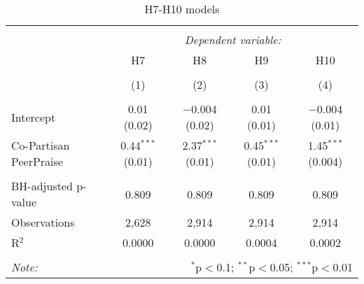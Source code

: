 
\begin{table}[!htbp] \centering 
  \caption{H7-H10 models} 
  \label{} 
\begin{tabular}{@{\extracolsep{5pt}}lcccc} 
\\[-1.8ex]\hline 
\hline \\[-1.8ex] 
 & \multicolumn{4}{c}{\textit{Dependent variable:}} \\ 
\cline{2-5} 
 & H7 & H8 & H9 & H10 \\ 
\\[-1.8ex] & (1) & (2) & (3) & (4)\\ 
\hline \\[-1.8ex] 
 Intercept & 0.01 (0.02) & $-$0.004 (0.02) & 0.01 (0.01) & $-$0.004 (0.01) \\ 
  Co-Partisan PeerPraise & 0.44$^{***}$ (0.01) & 2.37$^{***}$ (0.01) & 0.45$^{***}$ (0.01) & 1.45$^{***}$ (0.004) \\ 
 \hline \\[-1.8ex] 
BH-adjusted p-value & 0.809 & 0.809 & 0.809 & 0.809 \\ 
Observations & 2,628 & 2,914 & 2,914 & 2,914 \\ 
R$^{2}$ & 0.0000 & 0.0000 & 0.0004 & 0.0002 \\ 
\hline 
\hline \\[-1.8ex] 
\textit{Note:}  & \multicolumn{4}{r}{$^{*}$p$<$0.1; $^{**}$p$<$0.05; $^{***}$p$<$0.01} \\ 
\end{tabular} 
\end{table} 
